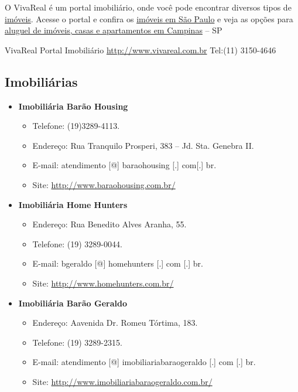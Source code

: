 O VivaReal é um portal imobiliário, onde você pode encontrar diversos tipos de
\href{http://www.vivareal.com.br}{imóveis}. Acesse o portal e confira os
\href{http://www.vivareal.com.br/venda/sp/sao-paulo/}{imóveis em São Paulo}
e veja as opções para
\href{http://www.vivareal.com.br/aluguel/sp/campinas/}{aluguel de imóveis, casas
    e apartamentos em Campinas} -- SP

VivaReal Portal Imobiliário
\url{http://www.vivareal.com.br}
Tel:(11) 3150-4646

\subsection{Imobiliárias}

\begin{itemize}
\item  \textbf{Imobiliária Barão Housing}
\begin{itemize}
\item  Telefone: (19)3289-4113.
\item  Endereço: Rua Tranquilo Prosperi, 383 -- Jd. Sta. Genebra II.
\item  E-mail: atendimento [@] baraohousing [.] com[.] br.
\item  Site: \url{http://www.baraohousing.com.br/}
\end{itemize}
\end{itemize}

\begin{itemize}
\item  \textbf{Imobiliária Home Hunters}
\begin{itemize}
\item  Endereço: Rua Benedito Alves Aranha, 55.
\item  Telefone: (19) 3289-0044.
\item  E-mail: bgeraldo [@] homehunters [.] com [.] br.
\item  Site: \url{http://www.homehunters.com.br/}
\end{itemize}
\end{itemize}

\begin{itemize}
\item  \textbf{Imobiliária Barão Geraldo}
\begin{itemize}
\item  Endereço: Aavenida Dr. Romeu Tórtima, 183.
\item  Telefone: (19) 3289-2315.
\item  E-mail: atendimento [@] imobiliariabaraogeraldo [.] com [.] br.
\item  Site: \url{http://www.imobiliariabaraogeraldo.com.br/}
\end{itemize}
\end{itemize}

